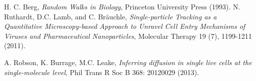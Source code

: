 \documentclass{article}
\begin{document}
\begin{thebibliography}{99}
H. C. Berg, {\em Random Walks in Biology},  Princeton University Press (1993).
N. Ruthardt, D.C. Lamb, and C. Br\"auchle, {\em Single-particle Tracking as a Quantitative Microscopy-based Approach to Unravel Cell Entry Mechanisms of Viruses and Pharmaceutical Nanoparticles},
Molecular Therapy 19 (7), 1199-1211 (2011).

A. Robson, K. Burrage, M.C. Leake, {\em Inferring diffusion in single live cells at the single-molecule level}, Phil Trans R Soc B 368: 20120029 (2013).
\end{thebibliography}
\end{document}
